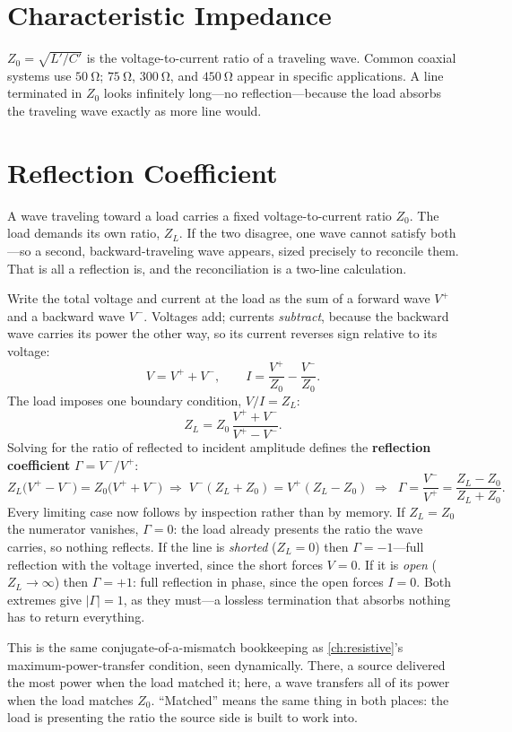 \section{Characteristic Impedance}
\(Z_0=\sqrt{L'/C'}\) is the voltage-to-current ratio of a traveling wave. Common
coaxial systems use \(\SI{50}{\ohm}\); \(\SI{75}{\ohm}\), \(\SI{300}{\ohm}\), and
\(\SI{450}{\ohm}\) appear in specific applications. A line terminated in \(Z_0\)
looks infinitely long---no reflection---because the load absorbs the traveling
wave exactly as more line would.

\section{Reflection Coefficient}
\label{sec:reflectionsection}
A wave traveling toward a load carries a fixed voltage-to-current ratio \(Z_0\). The
load demands its own ratio, \(Z_L\). If the two disagree, one wave cannot satisfy
both---so a second, backward-traveling wave appears, sized precisely to reconcile
them. That is all a reflection is, and the reconciliation is a two-line calculation.

Write the total voltage and current at the load as the sum of a forward wave
\(V^{+}\) and a backward wave \(V^{-}\). Voltages add; currents \emph{subtract},
because the backward wave carries its power the other way, so its current reverses
sign relative to its voltage:
\[
V=V^{+}+V^{-},
\qquad
I=\frac{V^{+}}{Z_0}-\frac{V^{-}}{Z_0}.
\]
The load imposes one boundary condition, \(V/I=Z_L\):
\[
Z_L=Z_0\,\frac{V^{+}+V^{-}}{V^{+}-V^{-}} .
\]
Solving for the ratio of reflected to incident amplitude defines the
\textbf{reflection coefficient} \(\Gamma=V^{-}/V^{+}\):
\[
Z_L\bigl(V^{+}-V^{-}\bigr)=Z_0\bigl(V^{+}+V^{-}\bigr)
\;\Rightarrow\;
V^{-}(Z_L+Z_0)=V^{+}(Z_L-Z_0)
\;\Rightarrow\;
\boxed{\;\Gamma=\frac{V^{-}}{V^{+}}=\frac{Z_L-Z_0}{Z_L+Z_0}.\;}
\]
Every limiting case now follows by inspection rather than by memory. If
\(Z_L=Z_0\) the numerator vanishes, \(\Gamma=0\): the load already presents the
ratio the wave carries, so nothing reflects. If the line is \emph{shorted}
(\(Z_L=0\)) then \(\Gamma=-1\)---full reflection with the voltage inverted, since the
short forces \(V=0\). If it is \emph{open} (\(Z_L\to\infty\)) then \(\Gamma=+1\):
full reflection in phase, since the open forces \(I=0\). Both extremes give
\(|\Gamma|=1\), as they must---a lossless termination that absorbs nothing has to
return everything.

\begin{controlsbox}
This is the same conjugate-of-a-mismatch bookkeeping as \cref{ch:resistive}'s
maximum-power-transfer condition, seen dynamically. There, a source delivered the
most power when the load matched it; here, a wave transfers all of its power when the
load matches \(Z_0\). ``Matched'' means the same thing in both places: the load is
presenting the ratio the source side is built to work into.
\end{controlsbox}


